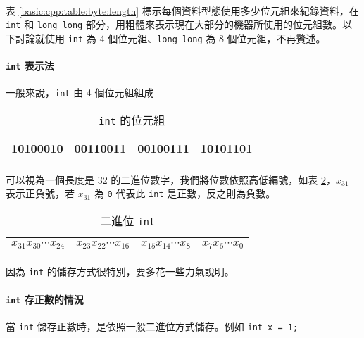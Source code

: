 \documentclass[12pt,a4paper,oneside]{article}
\begin{document}
\begin{CJK}{UTF8}{bkai}
\paragraph{}表 \ref{basic:cpp:table:byte:length} 標示每個資料型態使用多少位元組來紀錄資料，在 \lstinline!int! 和 \lstinline!long long! 部分，用粗體來表示現在大部分的機器所使用的位元組數。以下討論就使用 \lstinline!int! 為 4 個位元組、\lstinline!long long! 為 8 個位元組，不再贅述。

\paragraph{\lstinline!int! 表示法}一般來說，\lstinline!int! 由 4 個位元組組成

\begin{table}[h!]
\centering
\begin{tabular}{|c|c|c|c|}
\hline
10100010 & 00110011 & 00100111 & 10101101\\
\hline
\end{tabular}
\caption{\lstinline!int! 的位元組}
\label{basic:cpp:table:int}
\end{table}

\paragraph{}可以視為一個長度是 32 的二進位數字，我們將位數依照高低編號，如表 \ref{basic:cpp:table:int:variables}，$x_{31}$ 表示正負號，若 $x_{31}$ 為 \lstinline!0! 代表此 \lstinline!int! 是正數，反之則為負數。

\begin{table}[h!]
\centering
\begin{tabular}{|c|c|c|c|}
\hline
$x_{31}x_{30}\cdots{x_{24}}$ & $x_{23}x_{22}\cdots{x_{16}}$ & $x_{15}x_{14}\cdots{x_{8}}$ & $x_{7}x_{6}\cdots{x_{0}}$\\
\hline
\end{tabular}
\caption{二進位 \lstinline!int!}
\label{basic:cpp:table:int:variables}
\end{table}

\paragraph{}因為 \lstinline!int! 的儲存方式很特別，要多花一些力氣說明。

\paragraph{\lstinline!int! 存正數的情況}當 \lstinline!int! 儲存正數時，是依照一般二進位方式儲存。例如 \lstinline!int x = 1;!


\end{CJK}
\end{document}
